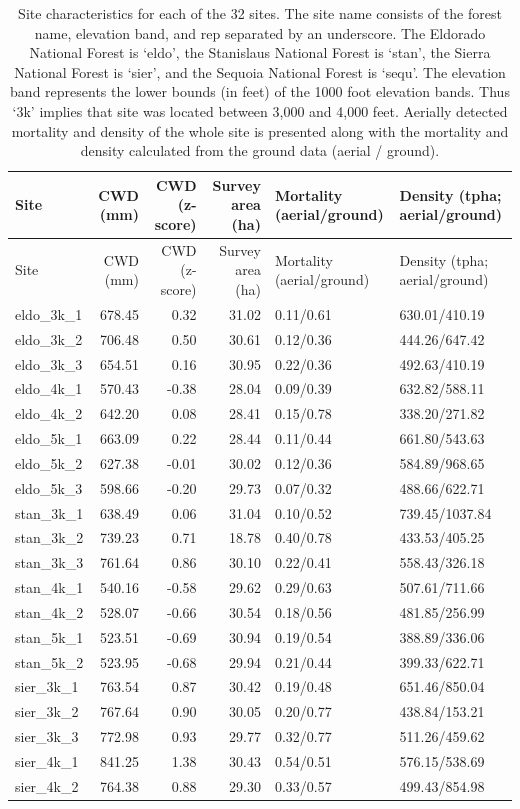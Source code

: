 \documentclass[]{article}
\begin{document}
\begin{longtable}[]{@{}lrrrll@{}}
\caption{Site characteristics for each of the 32 sites. The site name
consists of the forest name, elevation band, and rep separated by an
underscore. The Eldorado National Forest is `eldo', the Stanislaus
National Forest is `stan', the Sierra National Forest is `sier', and the
Sequoia National Forest is `sequ'. The elevation band represents the
lower bounds (in feet) of the 1000 foot elevation bands. Thus `3k'
implies that site was located between 3,000 and 4,000 feet. Aerially
detected mortality and density of the whole site is presented along with
the mortality and density calculated from the ground data (aerial /
ground).}\tabularnewline
\toprule
Site & CWD (mm) & CWD (z-score) & Survey area (ha) & Mortality
(aerial/ground) & Density (tpha; aerial/ground)\tabularnewline
\midrule
\endfirsthead
\toprule
Site & CWD (mm) & CWD (z-score) & Survey area (ha) & Mortality
(aerial/ground) & Density (tpha; aerial/ground)\tabularnewline
\midrule
\endhead
eldo\_3k\_1 & 678.45 & 0.32 & 31.02 & 0.11/0.61 &
630.01/410.19\tabularnewline
eldo\_3k\_2 & 706.48 & 0.50 & 30.61 & 0.12/0.36 &
444.26/647.42\tabularnewline
eldo\_3k\_3 & 654.51 & 0.16 & 30.95 & 0.22/0.36 &
492.63/410.19\tabularnewline
eldo\_4k\_1 & 570.43 & -0.38 & 28.04 & 0.09/0.39 &
632.82/588.11\tabularnewline
eldo\_4k\_2 & 642.20 & 0.08 & 28.41 & 0.15/0.78 &
338.20/271.82\tabularnewline
eldo\_5k\_1 & 663.09 & 0.22 & 28.44 & 0.11/0.44 &
661.80/543.63\tabularnewline
eldo\_5k\_2 & 627.38 & -0.01 & 30.02 & 0.12/0.36 &
584.89/968.65\tabularnewline
eldo\_5k\_3 & 598.66 & -0.20 & 29.73 & 0.07/0.32 &
488.66/622.71\tabularnewline
stan\_3k\_1 & 638.49 & 0.06 & 31.04 & 0.10/0.52 &
739.45/1037.84\tabularnewline
stan\_3k\_2 & 739.23 & 0.71 & 18.78 & 0.40/0.78 &
433.53/405.25\tabularnewline
stan\_3k\_3 & 761.64 & 0.86 & 30.10 & 0.22/0.41 &
558.43/326.18\tabularnewline
stan\_4k\_1 & 540.16 & -0.58 & 29.62 & 0.29/0.63 &
507.61/711.66\tabularnewline
stan\_4k\_2 & 528.07 & -0.66 & 30.54 & 0.18/0.56 &
481.85/256.99\tabularnewline
stan\_5k\_1 & 523.51 & -0.69 & 30.94 & 0.19/0.54 &
388.89/336.06\tabularnewline
stan\_5k\_2 & 523.95 & -0.68 & 29.94 & 0.21/0.44 &
399.33/622.71\tabularnewline
sier\_3k\_1 & 763.54 & 0.87 & 30.42 & 0.19/0.48 &
651.46/850.04\tabularnewline
sier\_3k\_2 & 767.64 & 0.90 & 30.05 & 0.20/0.77 &
438.84/153.21\tabularnewline
sier\_3k\_3 & 772.98 & 0.93 & 29.77 & 0.32/0.77 &
511.26/459.62\tabularnewline
sier\_4k\_1 & 841.25 & 1.38 & 30.43 & 0.54/0.51 &
576.15/538.69\tabularnewline
sier\_4k\_2 & 764.38 & 0.88 & 29.30 & 0.33/0.57 &
499.43/854.98\tabularnewline

\end{longtable}
\end{document}
